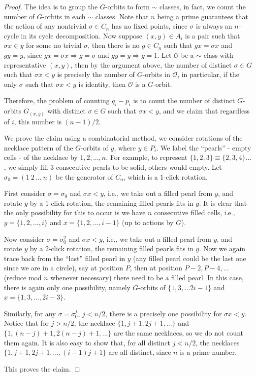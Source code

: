 \documentclass[12pt]{article}
\newcommand{\1}{\mathbb{I}}
\newcommand{\so}{\Rightarrow}
\theoremstyle{definition}
\theoremstyle{definition}
\theoremstyle{definition}
\theoremstyle{definition}
\theoremstyle{definition}
\theoremstyle{definition}
\begin{document}
\begin{proof} 

The idea is to group the $G$-orbits to form $\sim$ classes, in fact, we count the number of $G$-orbits  in each $\sim$ classes. Note that $n$ being a prime guarantees that the action of any nontrivial $\sigma \in C_n$ has no fixed points, since $\sigma$ is always an $n$-cycle in its cycle decomposition. Now suppose $(x, y) \in A_i$  is a pair such that $\sigma x \in y$ for some no trivial $\sigma$, then there is no $g \in C_n$ such that $gx = \sigma x$ and $g y = y$, since $gx = \sigma x \so g = \sigma $ and $g y = y \so g = 1$. Let $\mathcal O$ be a $\sim$ class with representative $(x, y)$, then by the argument above, the number of distinct $\sigma \in G$ such that $\sigma x < y$ is precisely the number of $G$-orbits in $\mathcal O$, in particular, if the only $\sigma $ such that $\sigma x < y$ is identity, then $\mathcal O$ is a $G$-orbit. 

Therefore, the problem of counting $q_i - p_i$ is to count the number of distinct $G$-orbits $G_{(x, y)}$ with distinct $\sigma \in G$ such that $\sigma x < y$, and we claim that regardless of $i$, this number is $(n-1)/2$.  

We prove the claim using a combinatorial method, we consider rotations of the necklace pattern of the $G$-orbits of $y$, where $y \in P_i$. We label the ``pearls'' - empty cells - of the necklace by $1, 2, ..., n$. For example, to represent $\{1, 2, 3\} \equiv \{2, 3, 4 \} ...$, we simply fill $3$ consecutive pearls to be solid, others would empty. Let $\sigma_0 = (1 \: 2 \: ... \: n)$ be the generator of $C_n$, which is a $1$-click rotation. 

First consider $\sigma = \sigma_0$ and $\sigma x < y$, i.e., we take out a filled pearl from $y$, and rotate $y$ by a $1$-click rotation, the remaining filled pearls fits in $y$. It is clear that the only possibility for this to occur is we have $n$ consecutive filled cells, i.e., $y = \{1, 2, ..., i\}$ and $x = \{1, 2, ..., i-1 \}$ (up to actions by $G$). 

Now consider $\sigma = \sigma_0^2$ and $\sigma x < y$,  i.e., we take out a filled pearl from $y$, and rotate $y$ by a $2$-click rotation, the remaining filled pearls fits in $y$. Now we again trace back from the ``last'' filled pearl in $y$ (any filled pearl could be the last one since we are in a circle), say at position $P$, then at position $P - 2, P -4, ... $ (reduce mod $n$ whenever necessary) there need to be a filled pearl. In this case, there is again only one possibility, namely $G$-orbits of $\{1, 3, ... 2i -1\}$  and $x = \{1, 3, ..., 2i -3\}$. 
  
Similarly, for any $\sigma = \sigma_0^{j}$, $j < n/2$, there is a precisely one possibility for $\sigma x < y$.  Notice that for $j > n/2$, the necklace $\{1, j+1,2j+1, ...  \}$ and $\{1, (n-j)+1, 2(n-j)+1, ... \}$ are the same necklaces, so we do not count them again. It is also easy to show that, for all distinct $j < n/2$, the necklaces $\{1, j+1, 2j+1, ..., (i-1)j+1\}$ are all distinct, since $n$ is a prime number. 

This proves the claim.
\end{proof}
\end{document}
